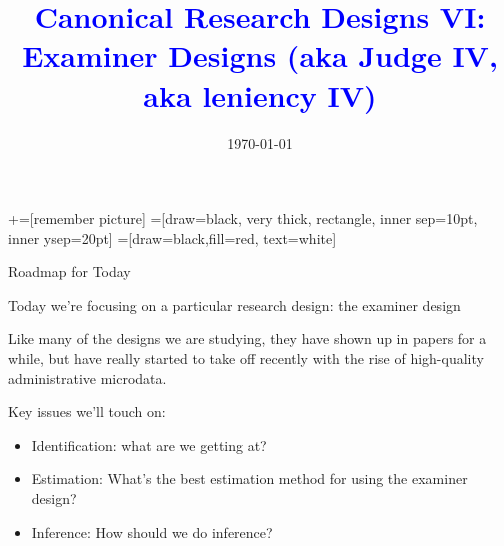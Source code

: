 \documentclass[notes,11pt, aspectratio=169]{beamer}
\title[]{\textcolor{blue}{Canonical Research Designs VI:\\ Examiner Designs (aka Judge IV, aka leniency IV) }}
\author[PGP]{}
\institute[FRBNY]{\small{\begin{tabular}{c}
  Paul Goldsmith-Pinkham  \\
\end{tabular}}}
\date{\today}
\newenvironment{wideitemize}{\itemize\addtolength{\itemsep}{10pt}}{\enditemize}
\begin{document}
\newcommand\marktopleft[1]{%
    \tikz[overlay,remember picture] 
        \node (marker-#1-a) at (-.3em,.3em) {};%
}
\newcommand\markbottomright[2]{%
    \tikz[overlay,remember picture] 
        \node (marker-#1-b) at (0em,0em) {};%
}
+=[remember picture] 
 =[draw=black, very thick, rectangle, inner sep=10pt, inner ysep=20pt]
 =[draw=black,fill=red, text=white]

\begin{frame}
\maketitle
\end{frame}

\begin{frame}{Roadmap for Today}
  \begin{wideitemize}
  \item Today we're focusing on a particular research design: the examiner design
  \item Like many of the designs we are studying, they have shown up
    in papers for a while, but have really started to take off
    recently with the rise of high-quality administrative microdata.
  \item Key issues we'll touch on:
    \begin{itemize}
    \item Identification: what are we getting at?
    \item Estimation: What's the best estimation method for using the
      examiner design?
    \item Inference: How should we do inference?
    \end{itemize}
  \end{wideitemize}
\end{frame}
\end{document}
